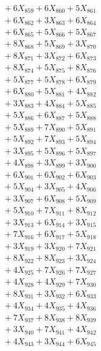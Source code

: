 \documentclass[a4paper,10pt]{article}
\begin{document}
{\begin{align}
&\;  + 6 X_{859} + 6 X_{860} + 5 X_{861} \\[0.3ex]
&\;  + 6 X_{862} + 3 X_{863} + 6 X_{864} \\[0.3ex]
&\;  + 6 X_{865} + 5 X_{866} + 5 X_{867} \\[0.3ex]
&\;  + 8 X_{868} + 5 X_{869} + 3 X_{870} \\[0.3ex]
&\;  + 8 X_{871} + 3 X_{872} + 6 X_{873} \\[0.3ex]
&\;  + 8 X_{874} + 5 X_{875} + 8 X_{876} \\[0.3ex]
&\;  + 5 X_{877} + 5 X_{878} + 6 X_{879} \\[0.5ex]\allowbreak
&\;  + 6 X_{880} + 5 X_{881} + 4 X_{882} \\[0.3ex]
&\;  + 3 X_{883} + 4 X_{884} + 5 X_{885} \\[0.3ex]
&\;  + 5 X_{886} + 6 X_{887} + 5 X_{888} \\[0.3ex]
&\;  + 5 X_{889} + 7 X_{890} + 5 X_{891} \\[0.3ex]
&\;  + 5 X_{892} + 7 X_{893} + 5 X_{894} \\[0.3ex]
&\;  + 3 X_{895} + 5 X_{896} + 5 X_{897} \\[0.3ex]
&\;  + 4 X_{898} + 3 X_{899} + 3 X_{900} \\[0.3ex]
&\;  + 6 X_{901} + 6 X_{902} + 6 X_{903} \\[0.3ex]
&\;  + 5 X_{904} + 3 X_{905} + 4 X_{906} \\[0.3ex]
&\;  + 3 X_{907} + 6 X_{908} + 5 X_{909} \\[0.5ex]\allowbreak
&\;  + 5 X_{910} + 7 X_{911} + 8 X_{912} \\[0.3ex]
&\;  + 3 X_{913} + 6 X_{914} + 3 X_{915} \\[0.3ex]
&\;  + 7 X_{916} + 6 X_{917} + 5 X_{918} \\[0.3ex]
&\;  + 3 X_{919} + 3 X_{920} + 7 X_{921} \\[0.3ex]
&\;  + 8 X_{922} + 8 X_{923} + 3 X_{924} \\[0.3ex]
&\;  + 4 X_{925} + 7 X_{926} + 7 X_{927} \\[0.3ex]
&\;  + 4 X_{928} + 4 X_{929} + 7 X_{930} \\[0.3ex]
&\;  + 8 X_{931} + 3 X_{932} + 6 X_{933} \\[0.3ex]
&\;  + 4 X_{934} + 4 X_{935} + 4 X_{936} \\[0.3ex]
&\;  + 7 X_{937} + 8 X_{938} + 8 X_{939} \\[0.5ex]\allowbreak
&\;  + 3 X_{940} + 7 X_{941} + 4 X_{942} \\[0.3ex]
&\;  + 4 X_{943} + 3 X_{944} + 6 X_{945} \\[0.3ex]

\end{align}}
\end{document}
